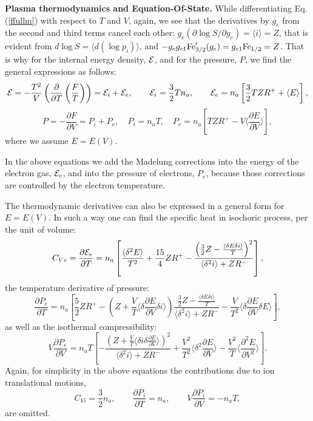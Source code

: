 {\bf Plasma thermodynamics and Equation-Of-State.} 
While differentiating Eq.(\ref{ffullm}) with respect to $T$ and $V$, again, we see that the derivatives
by $g_e$ from the second and third terms cancel 
each other: $g_e(\partial \log S/\partial g_e)=\langle i\rangle=Z$,
that is evident from $d \log S = \langle d (\log p_i) \rangle$,
and $-g_eg_{e1}{\rm Fe}^\prime_{3/2}(g_e)=g_{e1}{\rm Fe}_{1/2}=Z$.
That is why for the internal energy density,
${\cal E}$, and for the pressure, $P$, we find the general expressions
as follows:
\begin{equation}\label{generalE}
{\cal E} = -\frac{T^2}V\left(\frac{\partial}{\partial T}\left(\frac F T\right)\right)=
{\cal E}_i+{\cal E}_e,\qquad{\cal E}_i=\frac32Tn_a,\qquad
{\cal E}_e = n_a\left[ \frac32 T Z R^+ + \langle E \rangle \right],
\end{equation}
\begin{equation}\label{generalP}
P = -\frac{\partial F}{\partial V}=P_i+P_e,\quad
P_i = n_aT,\quad
P_e = n_a \left[ T ZR^+ - V \langle \frac{\partial E}{\partial V} \rangle \right],
\end{equation}
where we assume $E=E(V)$.

In the above equations we add the Madelung corrections into the energy of the electron gas, ${\cal E}_e$, and
into the pressure of electrons, $P_e$, because those corrections are controlled by the electron temperature.

The thermodynamic derivatives can also be expressed in a general form for $E=E(V)$.
In such a way one can find the specific heat in isochoric process, per the unit of volume:
\begin{equation}\label{generalCv}
C_{Ve}=\frac{\partial {\cal E}_e}{\partial T}=n_a\left[\frac{\langle\delta^2 E \rangle}{T^2}+\frac{15}4ZR^+
-\frac{\left(\frac32Z-\frac{\langle\delta E \delta i\rangle}T\right)^2}{\langle\delta^2i\rangle+ZR^-}\right],
\end{equation}
the temperature derivative of pressure:
\begin{equation}\label{generalPT}
\frac {\partial P_e}{\partial T}=
n_a\left[
	\frac52 Z R^+ -
	\left( Z+\frac{V}{T} \langle \delta \frac{\partial E}{\partial V} \delta i \rangle \right)
		\frac{\frac32Z-\frac{\langle\delta E \delta i\rangle}T}{\langle\delta^2i\rangle+ZR^-} -
	\frac{V}{T^2} \langle \delta \frac{\partial E}{\partial V} \delta E \rangle
\right],
\end{equation}
as well as the isothermal compressibility:
\begin{equation}\label{generalCompr}
V\frac{\partial P_e}{\partial V}=
n_a T \left[ -\frac{\left(Z + \frac{V}{T} \langle \delta i \delta \frac{\partial E}{\partial V} \rangle \right)^2}
{\langle \delta^2 i \rangle + ZR^-} +
\frac{V^2}{T^2} \langle \delta^2 \frac{\partial E}{\partial V} \rangle -
\frac{V^2}{T} \langle \frac{\partial^2 E}{\partial V^2} \rangle
\right].
\end{equation}
Again, for simplicity in the above equations the contributions due to ion translational motions,
\begin{equation}
C_{Vi}=\frac32n_a, \qquad
\frac{\partial P_i}{\partial T}=n_a, \qquad
V\frac{\partial P_i}{\partial V}=-n_aT,
\end{equation}
are omitted.

